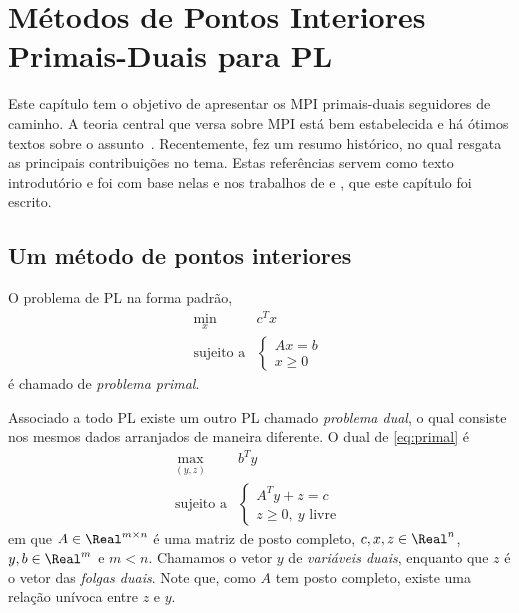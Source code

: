 

\chapter{Métodos de Pontos Interiores Primais-Duais  para \acl{PL}\label{chap:mpis}}


     

Este capítulo tem o objetivo de apresentar os \acl{MPI} primais-duais seguidores
de caminho. A teoria central que versa sobre \ac{MPI} está bem estabelecida e há
ótimos textos sobre o
assunto~\cite{Vanderbei:2008vp,Wright:Primal-dual-interior-point:1997h,Bazaraa:2009uu,Fang:1993wu}.
Recentemente, \textcite{Gondzio:2011ta} fez um resumo histórico, no qual resgata as
principais contribuições no tema.  Estas referências servem como texto
introdutório e foi com base nelas e nos trabalhos de 
 \textcite{Colombo:2008wm} e \textcite{Villas-Boas:2000}, que este capítulo foi
 escrito.
    

     

   
\section{Um método de  pontos interiores}
O  problema de \ac{PL} na forma padrão, 
\begin{equation} %
	\begin{array}{lc}
\displaystyle \min_{x} & c^Tx \\
\text{sujeito a} &\begin{cases} Ax = b \\
				 x \geq 0	
				 \end{cases}\
\end{array}
\label{eq:primal}
\end{equation}
é chamado de \emph{problema primal}.

Associado a todo \ac{PL} existe um outro \ac{PL} chamado 
\emph{problema dual}, o qual consiste nos mesmos dados arranjados de maneira
diferente. O dual de \eqref{eq:primal} é
 \begin{equation}%
	\begin{array}{lc}
\displaystyle \max_{(y,z)} & b^Ty \\
\text{sujeito a} &\begin{cases} A^Ty + z = c \\
				 z \geq 0, \:y \text{ livre}	
				 \end{cases}\
\end{array}
\label{eq:dual}
\end{equation}
em que $A\in \Real^{m\times n}$ é uma matriz de posto completo, $c,x,z\in
\Real^n$, $y,b\in\Real^m$ e $m<n$. Chamamos o vetor $y$ de
\emph{variáveis duais}, enquanto que  $z$ é o vetor das \emph{folgas duais}.
Note que, como $A$ tem posto completo, existe uma relação unívoca entre
$z$ e $y$. 

